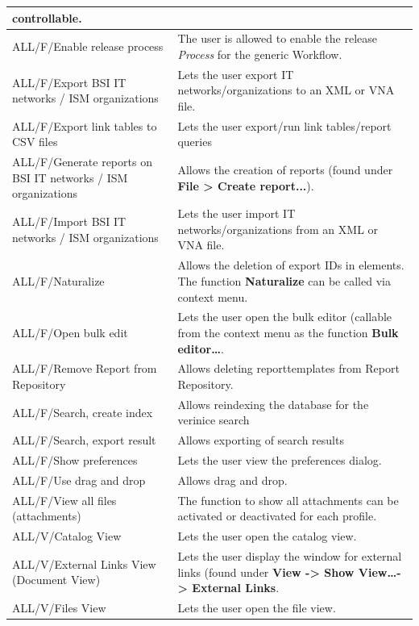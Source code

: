 \documentclass[a4paper,10pt]{book}
\begin{document}
\begin{longtable}{| p{5cm} | p{6cm} |}
controllable.  \\[10pt] \hline
ALL/F/Enable release process & The user is allowed to enable the
release \textit{Process} for the generic Workflow.  \\[10pt] \hline
ALL/F/Export BSI IT networks / ISM organizations & Lets the user export IT
networks/organizations to an XML or VNA file. \\[10pt] \hline
ALL/F/Export link tables to CSV files &  Lets the user export/run link tables/report queries \\[10pt] \hline
ALL/F/Generate reports on BSI IT networks / ISM organizations & Allows the
creation of reports (found under \textbf{File > Create report...}). \\[10pt]
\hline
ALL/F/Import BSI IT networks / ISM organizations & Lets the user import IT
networks/organizations from an XML or VNA file. \\[10pt] \hline
ALL/F/Naturalize & Allows the deletion of export IDs in elements. The function
\textbf{Naturalize} can be called via context menu. \\[10pt] \hline
ALL/F/Open bulk edit & Lets the user open the bulk editor (callable from the
context menu as the function \textbf{Bulk editor…}. \\[10pt] \hline
ALL/F/Remove Report from Repository & Allows deleting reporttemplates from
Report Repository. \\[10pt] \hline
ALL/F/Search, create index & Allows reindexing the database for the verinice
search \\[10pt] \hline
ALL/F/Search, export result & Allows exporting of search results \\[10pt] \hline
ALL/F/Show preferences & Lets the user view the preferences dialog. \\[10pt]
\hline
ALL/F/Use drag and drop & Allows drag and drop. \\[10pt] \hline
ALL/F/View all files \newline (attachments) & The function to show all
attachments can
be activated or deactivated for each profile. \\[10pt] \hline
ALL/V/Catalog View & Lets the user open the catalog view. \\[10pt] \hline
ALL/V/External Links View (Document View) & Lets the user display the window
for external links (found under \textbf{View -> Show View…-> External Links}.
\\[10pt] \hline
ALL/V/Files View & Lets the user open the file view.  \\[10pt] \hline

\end{longtable}
\end{document}
